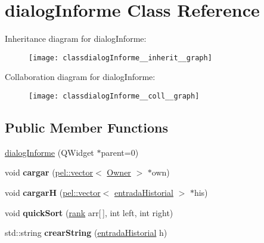 \hypertarget{classdialogInforme}{}\section{dialog\+Informe Class Reference}
\label{classdialogInforme}


Inheritance diagram for dialog\+Informe\+:
\nopagebreak
\begin{figure}[H]
\begin{center}
\leavevmode
\texttt{[image: classdialogInforme\_\_inherit\_\_graph]}
\end{center}
\end{figure}


Collaboration diagram for dialog\+Informe\+:
\nopagebreak
\begin{figure}[H]
\begin{center}
\leavevmode
\texttt{[image: classdialogInforme\_\_coll\_\_graph]}
\end{center}
\end{figure}
\subsection*{Public Member Functions}
\begin{DoxyCompactItemize}
\item 
\hyperlink{classdialogInforme_a8e040dbe734fc208c6ed0d1dc3c60eab}{dialog\+Informe} (Q\+Widget $\ast$parent=0)
\item 
\hypertarget{classdialogInforme_afa1d26c63603be099ef713801f72a437}{}void {\bfseries cargar} (\hyperlink{classpel_1_1vector}{pel\+::vector}$<$ \hyperlink{classOwner}{Owner} $>$ $\ast$own)\label{classdialogInforme_afa1d26c63603be099ef713801f72a437}

\item 
\hypertarget{classdialogInforme_a526efa48e046b004bb95469de631032e}{}void {\bfseries cargar\+H} (\hyperlink{classpel_1_1vector}{pel\+::vector}$<$ \hyperlink{classentradaHistorial}{entrada\+Historial} $>$ $\ast$his)\label{classdialogInforme_a526efa48e046b004bb95469de631032e}

\item 
\hypertarget{classdialogInforme_a3a5c9e4065f3bab64f8cd5e50fc9703f}{}void {\bfseries quick\+Sort} (\hyperlink{structrank}{rank} arr\mbox{[}$\,$\mbox{]}, int left, int right)\label{classdialogInforme_a3a5c9e4065f3bab64f8cd5e50fc9703f}

\item 
\hypertarget{classdialogInforme_a8a1f96fa6ccf54b1cfd605618e916b9a}{}std\+::string {\bfseries crear\+String} (\hyperlink{classentradaHistorial}{entrada\+Historial} h)\label{classdialogInforme_a8a1f96fa6ccf54b1cfd605618e916b9a}

\end{DoxyCompactItemize}


